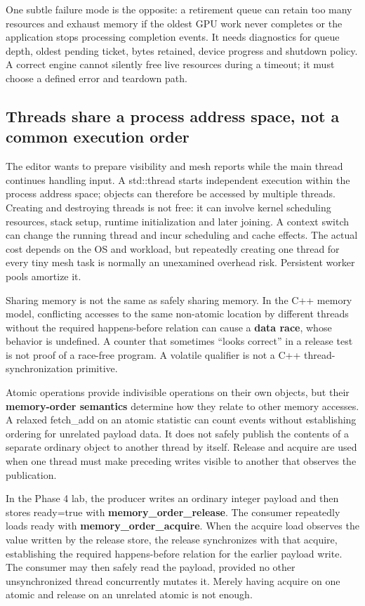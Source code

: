 One subtle failure mode is the opposite: a retirement queue can retain too many resources and exhaust memory if the oldest GPU work never completes or the application stops processing completion events. It needs diagnostics for queue depth, oldest pending ticket, bytes retained, device progress and shutdown policy. A correct engine cannot silently free live resources during a timeout; it must choose a defined error and teardown path.

\subsection{Threads share a process address space, not a common execution order}\label{01-foundations-i-ch007-threads-share-a-process-address-space-not-a-common-execution-order}

The editor wants to prepare visibility and mesh reports while the main thread continues handling input. A std::thread starts independent execution within the process address space; objects can therefore be accessed by multiple threads. Creating and destroying threads is not free: it can involve kernel scheduling resources, stack setup, runtime initialization and later joining. A context switch can change the running thread and incur scheduling and cache effects. The actual cost depends on the OS and workload, but repeatedly creating one thread for every tiny mesh task is normally an unexamined overhead risk. Persistent worker pools amortize it.

Sharing memory is not the same as safely sharing memory. In the C++ memory model, conflicting accesses to the same non-atomic location by different threads without the required happens-before relation can cause a \textbf{data race}, whose behavior is undefined. A counter that sometimes ``looks correct'' in a release test is not proof of a race-free program. A volatile qualifier is not a C++ thread-synchronization primitive.

Atomic operations provide indivisible operations on their own objects, but their \textbf{memory-order semantics} determine how they relate to other memory accesses. A relaxed fetch\_add on an atomic statistic can count events without establishing ordering for unrelated payload data. It does not safely publish the contents of a separate ordinary object to another thread by itself. Release and acquire are used when one thread must make preceding writes visible to another that observes the publication.

In the Phase 4 lab, the producer writes an ordinary integer payload and then stores ready=true with \textbf{memory\_order\_release}. The consumer repeatedly loads ready with \textbf{memory\_order\_acquire}. When the acquire load observes the value written by the release store, the release synchronizes with that acquire, establishing the required happens-before relation for the earlier payload write. The consumer may then safely read the payload, provided no other unsynchronized thread concurrently mutates it. Merely having acquire on one atomic and release on an unrelated atomic is not enough.

